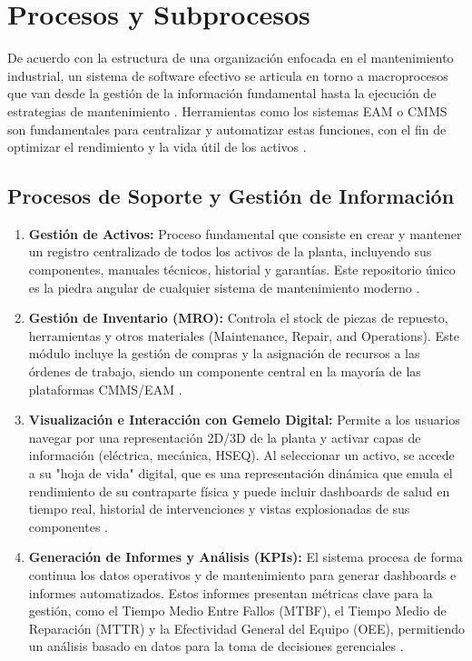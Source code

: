 \section{Procesos y Subprocesos}

De acuerdo con la estructura de una organización enfocada en el mantenimiento industrial, un sistema de software efectivo se articula en torno a macroprocesos que van desde la gestión de la información fundamental hasta la ejecución de estrategias de mantenimiento \parencite{ibm:2024, stum:2018}. Herramientas como los sistemas EAM o CMMS son fundamentales para centralizar y automatizar estas funciones, con el fin de optimizar el rendimiento y la vida útil de los activos \parencite{fluke:2020, sap:sf, tractian:2025a}.

\subsection{Procesos de Soporte y Gestión de Información}

\begin{enumerate}
    \item \textbf{Gestión de Activos:} Proceso fundamental que consiste en crear y mantener un registro centralizado de todos los activos de la planta, incluyendo sus componentes, manuales técnicos, historial y garantías. Este repositorio único es la piedra angular de cualquier sistema de mantenimiento moderno \parencite{ftmaintenance:2019, manwinwin:2015, mazenko:2015, servicenow:sf}.
    \item \textbf{Gestión de Inventario (MRO):} Controla el stock de piezas de repuesto, herramientas y otros materiales (Maintenance, Repair, and Operations). Este módulo incluye la gestión de compras y la asignación de recursos a las órdenes de trabajo, siendo un componente central en la mayoría de las plataformas CMMS/EAM \parencite{ftmaintenance:2019, honeywell:2018, laurila:2017, stum:2018}.
    \item \textbf{Visualización e Interacción con Gemelo Digital:} Permite a los usuarios navegar por una representación 2D/3D de la planta y activar capas de información (eléctrica, mecánica, HSEQ). Al seleccionar un activo, se accede a su "hoja de vida" digital, que es una representación dinámica que emula el rendimiento de su contraparte física y puede incluir dashboards de salud en tiempo real, historial de intervenciones y vistas explosionadas de sus componentes \parencite{chen:2025, miao:2025, osullivan:2020}.
    \item \textbf{Generación de Informes y Análisis (KPIs):} El sistema procesa de forma continua los datos operativos y de mantenimiento para generar dashboards e informes automatizados. Estos informes presentan métricas clave para la gestión, como el Tiempo Medio Entre Fallos (MTBF), el Tiempo Medio de Reparación (MTTR) y la Efectividad General del Equipo (OEE), permitiendo un análisis basado en datos para la toma de decisiones gerenciales \parencite{fiix:2019, ftmaintenance:2019, hxgn:sf, obrien:sf}.
\end{enumerate}

